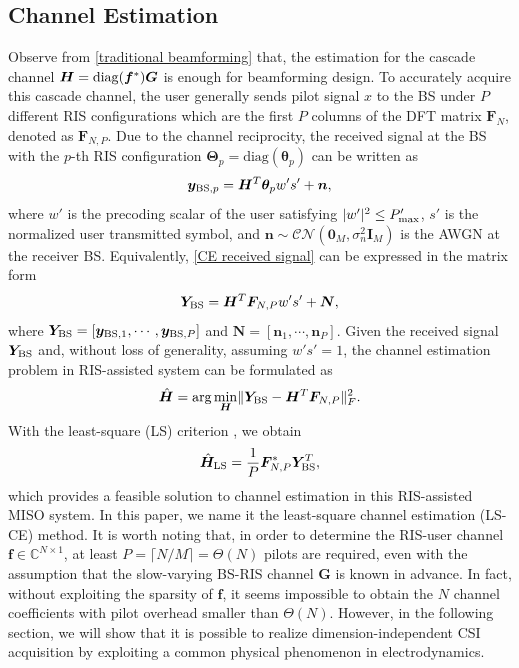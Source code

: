 \documentclass[journal,twocolumn]{IEEEtran}
\theoremstyle{nonumberplain}
\def \diag {\text{diag}}
\def \arg {\text{arg}}
\begin{document}
\subsection{Channel Estimation}
\label{Channel Estimation}
    Observe from \eqref{traditional beamforming} that, the estimation for the cascade channel ${\bm H} = {\rm diag}({\bm f}^{*})\bm G$ is enough for beamforming design.
    To accurately acquire this cascade channel, the user generally sends pilot signal $x$ to the BS under $P$ different RIS configurations which are the first $P$ columns of the DFT matrix $\bm F_N$, denoted as $\bm F_{N,P}$. 
    Due to the channel reciprocity, the received signal at the BS with the $p$-th RIS configuration $\bm \Theta_{p}=\diag({\bm \theta}_p)$ can be written as \cite{atapattu2020reconfigurable}
    \begin{equation}
    \label{CE received signal}
        {\bm y}_{{\rm BS}, p} =\bm H^{T} {\bm \theta}_p w' s'+\bm n,
    \end{equation}
    where $w'$ is the precoding scalar of the user satisfying $|w'|^2 \leq P_{\rm max}'$, $s'$ is the normalized user transmitted symbol, and $\bm n\sim \mathcal{CN}\left( \bm 0_{M}, \sigma_{n}^{2}\bm I_{M}\right)$ is the \ac{AWGN} at the receiver BS.
    Equivalently, \eqref{CE received signal} can be expressed in the matrix form
    \begin{equation}
    \label{eqn:LS_CE model}
        {\bm Y}_{\rm BS}=\bm H^{T} \bm F_{N,P}w' s' + {\bm N},
    \end{equation}
    where ${\bm Y}_{\rm BS}=\left[\bm y_{{\rm BS}, 1},\cdots,\bm y_{{\rm BS}, P}\right]$ and $\bm N = \left[ \bm n_{1},\cdots,\bm n_{P}\right]$.
    Given the received signal $\bm Y_{\rm BS}$ and, without loss of generality, assuming $w's'=1$, the channel estimation problem in RIS-assisted system can be formulated as 
    \begin{equation}
        \hat{\bm H} = \arg\min_{\bm H} \lVert {\bm Y}_{\rm BS} - {\bm H^{T}} {\bm F}_{N,P}\rVert_{F}^2.
    \end{equation}
    With the least-square (LS) criterion \cite{kundu2021channel}, we obtain
    \begin{equation}
        \hat{\bm H}_{\rm LS} = \frac{1}{P}{\bm F}_{N,P}^{*}{\bm Y}_{\rm BS}^{T},
        \label{eqn:LS-CE}
    \end{equation}
    which provides a feasible solution to channel estimation in this RIS-assisted MISO system. In this paper, we name it the least-square channel estimation (LS-CE) method. 
    It is worth noting that, in order to determine the RIS-user channel $\bm{f}\in\mathbb{C}^{N\times 1}$, at least $P = \lceil N/M \rceil = {\Theta}(N)$ pilots are required, even with the assumption that the slow-varying \cite{Huchen} BS-RIS channel $\bm G$ is known in advance. 
    In fact, without exploiting the sparsity of $\bm f$, it seems impossible to obtain the $N$ channel coefficients with pilot overhead smaller than $\Theta(N)$. 
    However, in the following section, we will show that it is possible to realize dimension-independent CSI acquisition by exploiting a common physical phenomenon in electrodynamics. 
\end{document}
